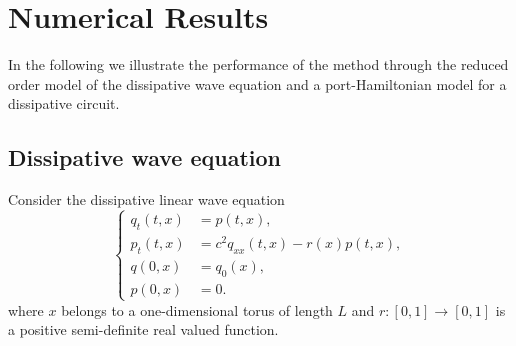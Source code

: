 





\section{Numerical Results} \label{p3.sec:4}
In the following we illustrate the performance of the method through the reduced order model of the dissipative wave equation and a port-Hamiltonian model for a dissipative circuit.

\subsection{Dissipative wave equation} \label{sec:4.1}

Consider the dissipative linear wave equation
\begin{equation} \label{p3.eq:4.1}
	\left\{
	\begin{aligned}
		q_{t}(t,x) &= p(t,x), \\
		p_{t}(t,x) &= c^2 q_{xx}(t,x) - r(x)  p(t,x) , \\
		q(0,x) &= q_0(x), \\
		p(0,x) &= 0.
	\end{aligned}
	\right.
\end{equation}
where $x$ belongs to a one-dimensional torus of length $L$ and $r:[0,1]\to[0,1]$ is a positive semi-definite real valued function. 


